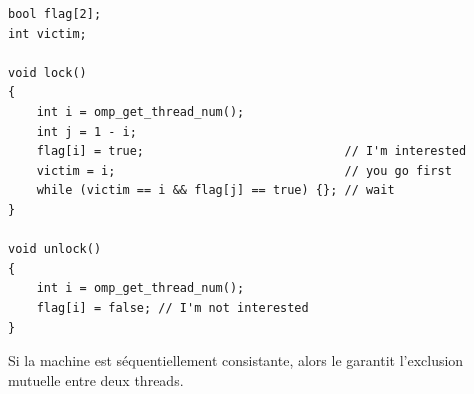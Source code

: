 \begin{myfilet}
\begin{verbatim}
bool flag[2];
int victim;

void lock() 
{
	int i = omp_get_thread_num();
	int j = 1 - i;
	flag[i] = true;                            // I'm interested
	victim = i;                                // you go first
	while (victim == i && flag[j] == true) {}; // wait
}

void unlock() 
{
	int i = omp_get_thread_num();
	flag[i] = false; // I'm not interested
}
\end{verbatim}
\end{myfilet}

\begin{theorem}
  Si la machine est séquentiellement consistante, alors le  garantit l'exclusion mutuelle entre deux threads.
\end{theorem}

